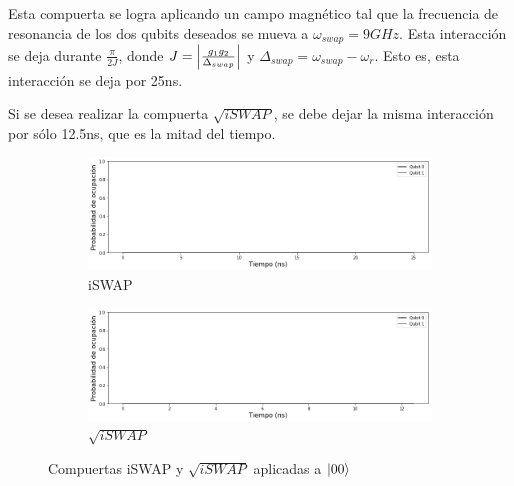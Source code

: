 Esta compuerta se logra aplicando un campo magnético tal que la frecuencia de resonancia de los dos qubits deseados se mueva a $\omega_{swap} = 9GHz$. Esta interacción se deja durante $\frac{\pi}{2 J}$, donde $J = \abs{\frac{g_1 g_2}{\Delta_{swap}}}$ y $\Delta_{swap} = \omega_{swap} - \omega_r$. Esto es, esta interacción se deja por 25ns.

Si se desea realizar la compuerta $\sqrt{iSWAP}$, se debe dejar la misma interacción por sólo 12.5ns, que es la mitad del tiempo.

\begin{figure}[H]
    \centering
    \begin{subfigure}[m]{0.49\textwidth}
        \centering \includegraphics[width=1\linewidth]{img/iswap00.png}
        \caption{iSWAP}
    \end{subfigure}
    \begin{subfigure}[m]{0.49\textwidth}
        \centering \includegraphics[width=1\linewidth]{img/sqrtiswap00.png}
        \caption{$\sqrt{iSWAP}$}
    \end{subfigure}
    \caption[Compuertas iSWAP y $\sqrt{iSWAP}$ aplicadas a $\ket{00}$]{Compuertas iSWAP y $\sqrt{iSWAP}$ aplicadas a $\ket{00}$}
\label{fig:iswapsqrtiswap00}
\end{figure}

